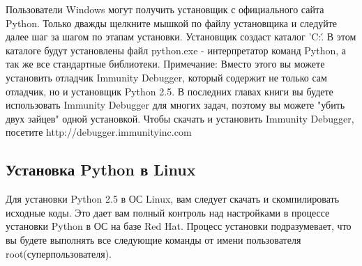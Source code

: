 \documentclass[12pt, a4paper, oneside]{book}
\begin{document}
Пользователи Windows могут получить установщик с официального сайта Python. Только дважды щелкните мышкой по файлу установщика и следуйте далее шаг за шагом по этапам установки. Установщик создаст каталог 'C:\'. В этом каталоге будут установлены файл python.exe - интерпретатор команд Python, а так же все стандартные библиотеки.
Примечание: Вместо этого вы можете установить отладчик Immunity Debugger, который содержит не только сам отладчик, но и установщик Python 2.5. В последних главах книги вы будете использовать Immunity Debugger для многих задач, поэтому вы можете "убить двух зайцев" одной установкой. Чтобы скачать и установить Immunity Debugger, посетите http://debugger.immunityinc.com
\subsection{Установка Python в Linux}

Для установки Python 2.5 в ОС Linux, вам следует скачать и скомпилировать исходные коды. Это дает вам полный контроль над настройками в процессе установки Python в ОС на базе Red Hat. Процесс установки подразумевает, что вы будете выполнять все следующие команды от имени пользователя root(суперпользователя).\\
\end{document}
